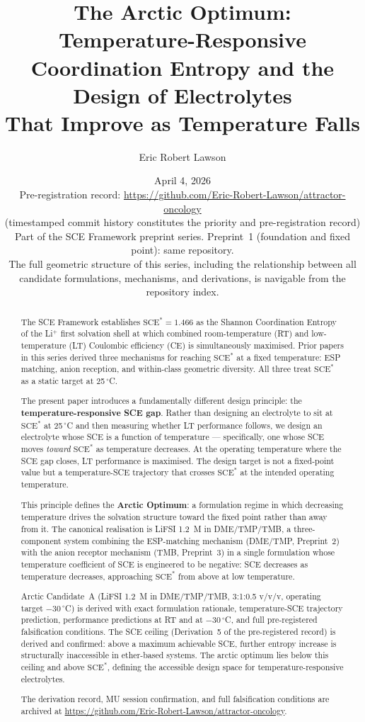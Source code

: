 \documentclass[11pt]{article}
\title{\textbf{The Arctic Optimum: Temperature-Responsive\\
Coordination Entropy and the Design of Electrolytes\\
That Improve as Temperature Falls}}
\author[1]{Eric Robert Lawson}
\affil[1]{Independent Researcher, OrganismCore Initiative\\
\texttt{ORCID: 0009-0002-0414-6544}\\
Repository: \url{https://github.com/Eric-Robert-Lawson/attractor-oncology}}
\date{April 4, 2026\\
\small Pre-registration record:
\url{https://github.com/Eric-Robert-Lawson/attractor-oncology}\\
\small (timestamped commit history constitutes the priority
and pre-registration record)\\
\small Part of the SCE Framework preprint series.
Preprint~1 (foundation and fixed point):
same repository.\\
\small The full geometric structure of this series,
including the relationship between all candidate formulations,
mechanisms, and derivations, is navigable from the repository
index.}
\theoremstyle{plain}
\theoremstyle{definition}
\theoremstyle{remark}
\begin{document}
\maketitle

\begin{abstract}
The SCE Framework establishes $\mathrm{SCE}^{*} = 1.466$ as the
Shannon Coordination Entropy of the Li$^+$ first solvation shell at
which combined room-temperature (RT) and low-temperature (LT)
Coulombic efficiency (CE) is simultaneously maximised.  Prior papers
in this series derived three mechanisms for reaching
$\mathrm{SCE}^{*}$ at a fixed temperature: ESP matching, anion
reception, and within-class geometric diversity.  All three treat
$\mathrm{SCE}^{*}$ as a static target at 25\,$^\circ$C.

The present paper introduces a fundamentally different design
principle: the \textbf{temperature-responsive SCE gap}.  Rather than
designing an electrolyte to sit at $\mathrm{SCE}^{*}$ at
25\,$^\circ$C and then measuring whether LT performance follows,
we design an electrolyte whose SCE is a function of temperature
--- specifically, one whose SCE moves \emph{toward} $\mathrm{SCE}^{*}$
as temperature decreases.  At the operating temperature where the SCE
gap closes, LT performance is maximised.  The design target is not a
fixed-point value but a temperature-SCE trajectory that crosses
$\mathrm{SCE}^{*}$ at the intended operating temperature.

This principle defines the \textbf{Arctic Optimum}: a formulation
regime in which decreasing temperature drives the solvation structure
toward the fixed point rather than away from it.  The canonical
realisation is LiFSI 1.2~M in DME/TMP/TMB, a three-component system
combining the ESP-matching mechanism (DME/TMP, Preprint~2) with the
anion receptor mechanism (TMB, Preprint~3) in a single formulation
whose temperature coefficient of SCE is engineered to be negative:
SCE decreases as temperature decreases, approaching $\mathrm{SCE}^{*}$
from above at low temperature.

Arctic Candidate~A (LiFSI 1.2~M in DME/TMP/TMB, 3:1:0.5 v/v/v,
operating target $-30\,^\circ$C) is derived with exact formulation
rationale, temperature-SCE trajectory prediction,
performance predictions at RT and at $-30\,^\circ$C, and full
pre-registered falsification conditions.  The SCE ceiling
(Derivation~5 of the pre-registered record) is derived and confirmed:
above a maximum achievable SCE, further entropy increase is
structurally inaccessible in ether-based systems.  The arctic optimum
lies below this ceiling and above $\mathrm{SCE}^{*}$, defining the
accessible design space for temperature-responsive electrolytes.

The derivation record, MU session confirmation, and full falsification
conditions are archived at
\url{https://github.com/Eric-Robert-Lawson/attractor-oncology}.
\end{abstract}
\end{document}
